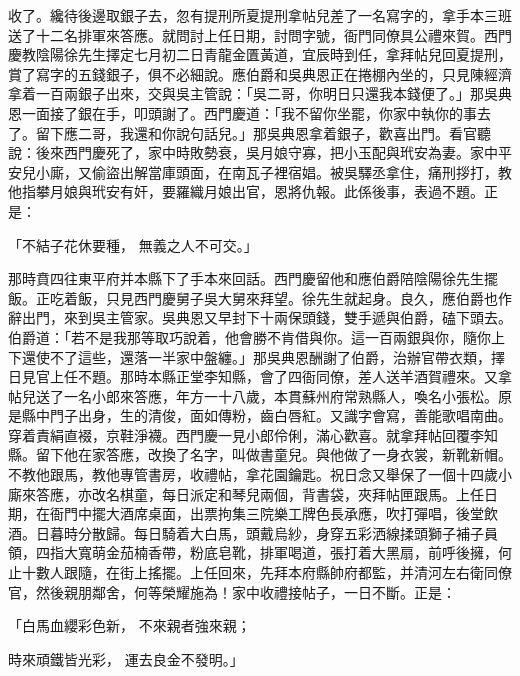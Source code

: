 \begin{showcontents}{}
收了。纔待後邊取銀子去，忽有提刑所夏提刑拿帖兒差了一名寫字的，拿手本三班送了十二名排軍來答應。就問討上任日期，討問字號，衙門同僚具公禮來賀。西門慶教陰陽徐先生擇定七月初二日青龍金匱黃道，宜辰時到任，拿拜帖兒回夏提刑，賞了寫字的五錢銀子，俱不必細說。應伯爵和吳典恩正在捲棚內坐的，只見陳經濟拿着一百兩銀子出來，交與吳主管說：「吳二哥，你明日只還我本錢便了。」那吳典恩一面接了銀在手，叩頭謝了。西門慶道：「我不留你坐罷，你家中執你的事去了。留下應二哥，我還和你說句話兒。」那吳典恩拿着銀子，歡喜出門。看官聽說：後來西門慶死了，家中時敗勢衰，吳月娘守寡，把小玉配與玳安為妻。家中平安兒小廝，又偷盜出解當庫頭面，在南瓦子裡宿娼。被吳驛丞拿住，痛刑拶打，教他指攀月娘與玳安有奸，要羅織月娘出官，恩將仇報。此係後事，表過不題。正是：

「不結子花休要種，  無義之人不可交。」

那時賁四往東平府并本縣下了手本來回話。西門慶留他和應伯爵陪陰陽徐先生擺飯。正吃着飯，只見西門慶舅子吳大舅來拜望。徐先生就起身。良久，應伯爵也作辭出門，來到吳主管家。吳典恩又早封下十兩保頭錢，雙手遞與伯爵，磕下頭去。伯爵道：「若不是我那等取巧說着，他會勝不肯借與你。這一百兩銀與你，隨你上下還使不了這些，還落一半家中盤纏。」那吳典恩酬謝了伯爵，治辦官帶衣類，擇日見官上任不題。那時本縣正堂李知縣，會了四衙同僚，差人送羊酒賀禮來。又拿帖兒送了一名小郎來答應，年方一十八歲，本貫蘇州府常熟縣人，喚名小張松。原是縣中門子出身，生的清俊，面如傳粉，齒白唇紅。又識字會寫，善能歌唱南曲。穿着責絹直裰，京鞋淨襪。西門慶一見小郎伶俐，滿心歡喜。就拿拜帖回覆李知縣。留下他在家答應，改換了名字，叫做書童兒。與他做了一身衣裳，新靴新帽。不教他跟馬，教他專管書房，收禮帖，拿花園鑰匙。祝日念又舉保了一個十四歲小廝來答應，亦改名棋童，每日派定和琴兒兩個，背書袋，夾拜帖匣跟馬。上任日期，在衙門中擺大酒席桌面，出票拘集三院樂工牌色長承應，吹打彈唱，後堂飲酒。日暮時分散歸。每日騎着大白馬，頭戴烏紗，身穿五彩洒線揉頭獅子補子員領，四指大寬萌金茄楠香帶，粉底皂靴，排軍喝道，張打着大黑扇，前呼後擁，何止十數人跟隨，在街上搖擺。上任回來，先拜本府縣帥府都監，并清河左右衛同僚官，然後親朋鄰舍，何等榮耀施為！家中收禮接帖子，一日不斷。正是：

「白馬血纓彩色新，  不來親者強來親；

時來頑鐵皆光彩，  運去良金不發明。」


\end{showcontents}
